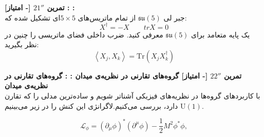 \documentclass{article}
\newenvironment{exercise}[3][\unskip]{%
	\par
	\noindent
	\textbf{تمرین
		#1
		[- امتیاز] 
		\def\temp{#3}\ifx\temp\empty
		: 
		\else
		: #3 \vspace{0.5em} \\ \noindent
		\fi
}}{}
\begin{document}
	
	\begin{exercise}[$21''$]{20}{}
		جبر لی 
		$\mathfrak{su}(5)$ 
		از تمام ماتریس‌های 
		$5 \times 5$ای 
		تشکیل شده که: 
		\begin{equation*}
			X^{\dag}=-X \quad \quad trX =0
		\end{equation*}
		یک پایه متعامد برای 
		$\mathfrak{su}(5)$
		معرفی کنید. 
		ضرب داخلی فضای ماتریسی را چنین در نظر بگیرید:
		‌
		\[\left<X_j,X_k \right>=\text{Tr}(X_jX_k^{\dag})
		\]
	\end{exercise}
	
	\begin{exercise}[$22''$]{20}{گروه‌های تقارنی در نظریه‌ی میدان}
		با کاربرد‌های گروه‌ها در نظریه‌های فیزیکی آشناتر شویم و ساده‌ترین مدلی را که تقارن
		$\text{U}(1)$
		دارد، بررسی می‌کنیم.لاگرانژی این کنش را در زیر می‌بینیم.
		
		\[
		\mathcal{L}_{\phi} = (\partial_\mu {\phi})^* (\partial^\mu {\phi}) - \frac12 M^2 \phi^*\phi,
		\]
		
	\end{exercise}
	\noindent
\end{document}
